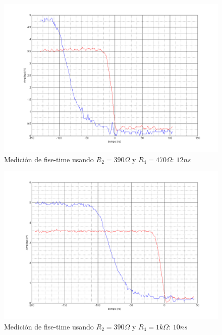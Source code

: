 \documentclass[12pt,a4paper]{article}
\begin{document}
\begin{figure}[H]
\centering
\includegraphics[width=\textwidth]{img/FT1.png}
\caption{Medición de fise-time usando $R_2=390\Omega$ y $R_4=470\Omega$: $12ns$}
\end{figure}

\begin{figure}[H]
\centering
\includegraphics[width=\textwidth]{img/FT2.png}
\caption{Medición de fise-time usando $R_2=390\Omega$ y $R_4=1k\Omega$: $10ns$}
\end{figure}
\end{document}
